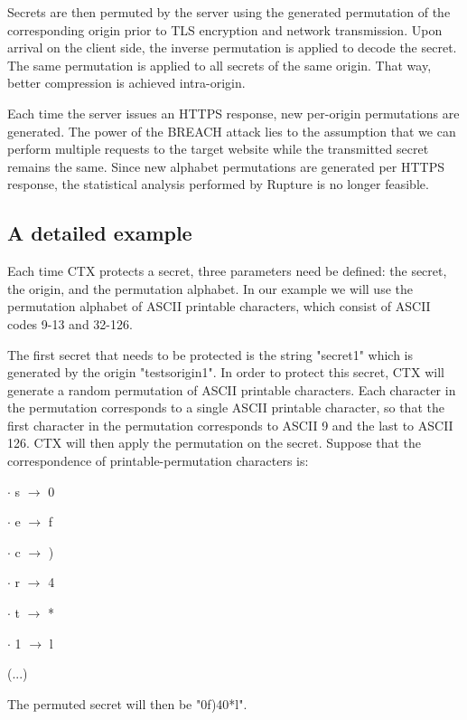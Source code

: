 \documentclass[a4paper, 11 pt, conference]{article}  %
\begin{document}
Secrets are then permuted by the server using the generated permutation of the
corresponding origin prior to TLS encryption and network transmission. Upon
arrival on the client side, the inverse permutation is applied to decode the
secret. The same permutation is applied to all secrets of the same origin. That
way, better compression is achieved intra-origin.

Each time the server issues an HTTPS response, new per-origin permutations are
generated. The power of the BREACH attack lies to the assumption that we can perform
multiple requests to the target website while the transmitted secret remains the same. Since new alphabet permutations are generated per HTTPS response, the statistical analysis performed by Rupture is no longer feasible.

\subsection{A detailed example}

Each time CTX protects a secret, three parameters need be defined: the secret,
the origin, and the permutation alphabet. In our example we will use the
permutation alphabet of ASCII printable characters, which consist of ASCII codes
9-13 and 32-126.

The first secret that needs to be protected is the string "secret1" which is
generated by the origin "testsorigin1". In order to protect this secret, CTX
will generate a random permutation of ASCII printable characters. Each character
in the permutation corresponds to a single ASCII printable character, so that
the first character in the permutation corresponds to ASCII 9 and the last to
ASCII 126. CTX will then apply the permutation on the secret. Suppose that the
correspondence of printable-permutation characters is:

\begin{description}
    \item{$\cdot$ s} $\rightarrow$ 0
    \item{$\cdot$ e} $\rightarrow$ f
    \item{$\cdot$ c} $\rightarrow$ )
    \item{$\cdot$ r} $\rightarrow$ 4
    \item{$\cdot$ t} $\rightarrow$ *
    \item{$\cdot$ 1} $\rightarrow$ l
    \item (...)
\end{description}

The permuted secret will then be "0f)40*l".
\end{document}
